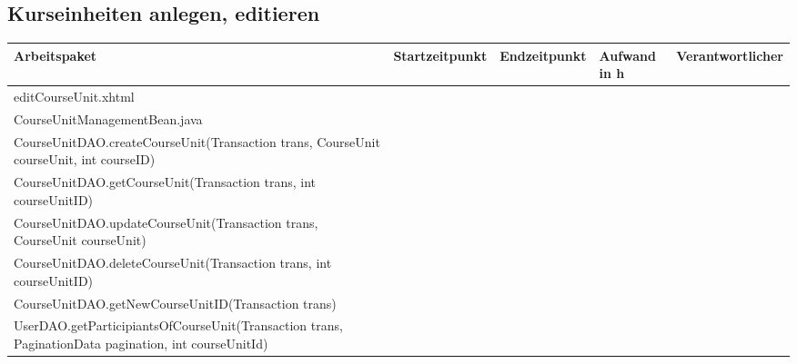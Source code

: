 \begin{landscape}
	\subsection{Kurseinheiten anlegen, editieren}
	\begin{tabular}{|p{10cm}|p{4cm}|p{3cm}|p{3cm}|p{3cm}|}
		\hline  \textbf{Arbeitspaket} & \textbf{Startzeitpunkt} & \textbf{Endzeitpunkt} & \textbf{Aufwand in h} & \textbf{Verantwortlicher} \\ 
		\hline   editCourseUnit.xhtml                                       &                            &                            &                     &\\
		\hline   CourseUnitManagementBean.java                              &                            &                            &                     &\\
		\hline   CourseUnitDAO.createCourseUnit(Transaction trans, CourseUnit courseUnit, int courseID)  &                            &                             &                     &\\ 
		\hline   CourseUnitDAO.getCourseUnit(Transaction trans, int courseUnitID)                        &                            &                             &                     &\\ 
		\hline   CourseUnitDAO.updateCourseUnit(Transaction trans, CourseUnit courseUnit)                &                            &                             &                     &\\ 
		\hline   CourseUnitDAO.deleteCourseUnit(Transaction trans, int courseUnitID)                     &                            &                             &                     &\\ 
		\hline   CourseUnitDAO.getNewCourseUnitID(Transaction trans)        &                            &                            &                     &\\ 
		\hline   UserDAO.getParticipiantsOfCourseUnit(Transaction trans, PaginationData pagination, int courseUnitId)&                            &                             &                     &\\ 
		\hline 
	\end{tabular} \ \\
	\ \\
	
\end{landscape}




